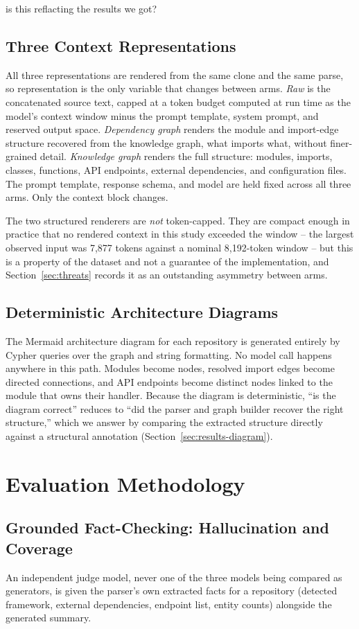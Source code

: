 is this reflacting the results we got?\documentclass[conference]{IEEEtran}
\begin{document}
\subsection{Three Context Representations}
All three representations are rendered from the same clone and the same parse, so representation
is the only variable that changes between arms. \emph{Raw} is the concatenated source text,
capped at a token budget computed at run time as the model's context window minus the prompt
template, system prompt, and reserved output space. \emph{Dependency graph} renders the module
and import-edge structure recovered from the knowledge graph, what imports what, without
finer-grained detail. \emph{Knowledge graph} renders the full structure: modules, imports,
classes, functions, API endpoints, external dependencies, and configuration files. The prompt
template, response schema, and model are held fixed across all three arms. Only the context
block changes.

The two structured renderers are \emph{not} token-capped. They are compact enough in practice
that no rendered context in this study exceeded the window -- the largest observed input was
7{,}877 tokens against a nominal 8{,}192-token window -- but this is a property of the dataset
and not a guarantee of the implementation, and Section~\ref{sec:threats} records it as an
outstanding asymmetry between arms.

\subsection{Deterministic Architecture Diagrams}
The Mermaid architecture diagram for each repository is generated entirely by Cypher queries
over the graph and string formatting. No model call happens anywhere in this path. Modules
become nodes, resolved import edges become directed connections, and API endpoints become
distinct nodes linked to the module that owns their handler. Because the diagram is
deterministic, ``is the diagram correct'' reduces to ``did the parser and graph builder recover
the right structure,'' which we answer by comparing the extracted structure directly against a
structural annotation (Section~\ref{sec:results-diagram}).

\section{Evaluation Methodology}
\label{sec:methodology}

\subsection{Grounded Fact-Checking: Hallucination and Coverage}
An independent judge model, never one of the three models being compared as generators, is
given the parser's own extracted facts for a repository (detected framework, external
dependencies, endpoint list, entity counts) alongside the generated summary.
\end{document}
